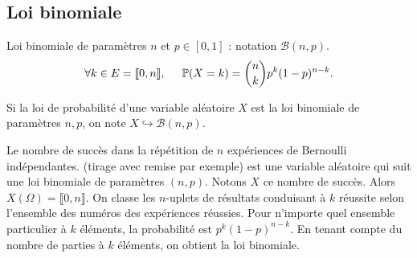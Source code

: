\subsection{Loi binomiale}  
\begin{defi}
Loi binomiale de paramètres $n$ et $p\in [0,1]$ : notation $\mathcal{B}(n,p)$.
\begin{displaymath}
\forall k \in E=\llbracket 0 , n\rrbracket, \hspace{0.5cm} \mathbb{P}(X=k) = \binom{n}{k}p^k(1-p)^{n-k}. 
\end{displaymath}  
\end{defi}
\begin{nota}
Si la loi de probabilité d'une variable aléatoire $X$ est la loi binomiale de paramètres $n,p$, on note $X\hookrightarrow \mathcal{B}(n,p)$.
\end{nota}
\begin{exple}
  Le nombre de succès dans la répétition de $n$ expériences de Bernoulli indépendantes. (tirage avec remise par exemple) est une variable aléatoire qui suit une loi binomiale de paramètres $(n,p)$.\newline
  Notons $X$ ce nombre de succès. Alors $X(\Omega) = \llbracket 0, n\rrbracket$. On classe les $n$-uplets de résultats conduisant à $k$ réussite selon l'ensemble des numéros des expériences réussies. Pour n'importe quel ensemble particulier à $k$ éléments, la probabilité est $p^k(1-p)^{n-k}$. En tenant compte du nombre de parties à $k$ éléments, on obtient la loi binomiale. 
\end{exple}

